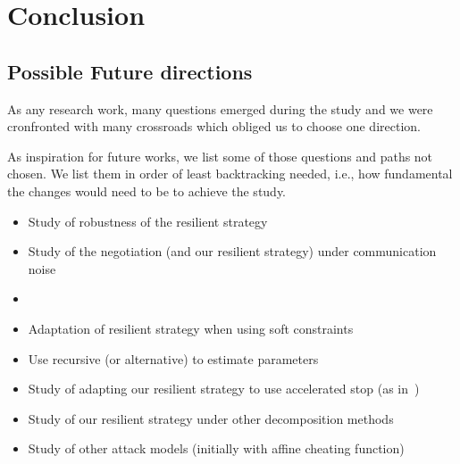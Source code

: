 \documentclass[../main.tex]{subfiles}
\begin{document}
\chapter{Conclusion}\label{sec:conclusion}

\section{Possible Future directions}
As any research work, many questions emerged during the study and we were cronfronted with many crossroads which obliged us to choose one direction.

As inspiration for future works, we list some of those questions and paths not chosen. We list them in order of least backtracking needed, i.e., how fundamental the changes would need to be to achieve the study.
\begin{itemize}
  \item Study of robustness of the resilient strategy
  \item Study of the negotiation (and our resilient strategy) under communication noise
  \item {}
  \item Adaptation of resilient strategy when using soft constraints~\cite{AlessioBemporad2009}
  \item Use recursive \EM{} (or alternative) to estimate parameters
  \item Study of adapting our resilient strategy to use accelerated stop (as in~\cite{DaiEtAl2017})
  \item Study of our resilient strategy under other decomposition methods
  \item Study of other attack models (initially with affine cheating function)
\end{itemize}
\end{document}
